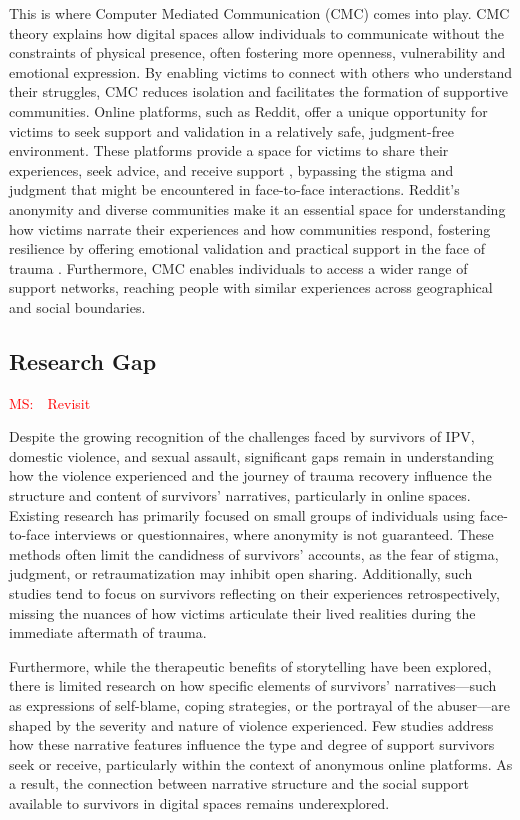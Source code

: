 \documentclass[11pt]{article}
\newcommand{\ms}[1]{\textcolor{red}{{MS:~~#1}}}
\begin{document}
This is where Computer Mediated Communication (CMC) \citep{walther2011theories}  comes into play.
CMC theory explains how digital spaces allow individuals to communicate without the constraints of physical presence, often fostering more openness, vulnerability and emotional expression.
By enabling victims to connect with others who understand their struggles, CMC reduces isolation and facilitates the formation of supportive communities.
Online platforms, such as Reddit, offer a unique opportunity for victims to seek support and validation in a relatively safe, judgment-free environment.
These platforms provide a space for victims to share their experiences, seek advice, and receive support \citep{goffman1963embarrassment}, bypassing the stigma and judgment that might be encountered in face-to-face interactions.
Reddit's anonymity and diverse communities make it an essential space for understanding how victims narrate their experiences and how communities respond, fostering resilience by offering emotional validation and practical support in the face of trauma \citep{proferes2021studying}.
Furthermore, CMC enables individuals to access a wider range of support networks, reaching people with similar experiences across geographical and social boundaries. 

\subsection{Research Gap}

\ms{Revisit}

Despite the growing recognition of the challenges faced by survivors of IPV, domestic violence, and sexual assault, significant gaps remain in understanding how the violence experienced and the journey of trauma recovery influence the structure and content of survivors' narratives, particularly in online spaces. 
Existing research has primarily focused on small groups of individuals using face-to-face interviews or questionnaires, where anonymity is not guaranteed. These methods often limit the candidness of survivors' accounts, as the fear of stigma, judgment, or retraumatization may inhibit open sharing. 
Additionally, such studies tend to focus on survivors reflecting on their experiences retrospectively, missing the nuances of how victims articulate their lived realities during the immediate aftermath of trauma.

Furthermore, while the therapeutic benefits of storytelling have been explored, there is limited research on how specific elements of survivors' narratives—such as expressions of self-blame, coping strategies, or the portrayal of the abuser—are shaped by the severity and nature of violence experienced. 
Few studies address how these narrative features influence the type and degree of support survivors seek or receive, particularly within the context of anonymous online platforms.
As a result, the connection between narrative structure and the social support available to survivors in digital spaces remains underexplored.
\end{document}

